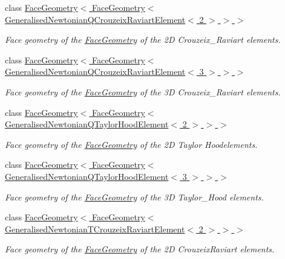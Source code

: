 \begin{DoxyCompactItemize}
\item 
class \hyperlink{classoomph_1_1FaceGeometry_3_01FaceGeometry_3_01GeneralisedNewtonianQCrouzeixRaviartElement_3_012_01_4_01_4_01_4}{Face\+Geometry$<$ Face\+Geometry$<$ Generalised\+Newtonian\+Q\+Crouzeix\+Raviart\+Element$<$ 2 $>$ $>$ $>$}
\begin{DoxyCompactList}\small\item\em Face geometry of the \hyperlink{classoomph_1_1FaceGeometry}{Face\+Geometry} of the 2D Crouzeix\+\_\+\+Raviart elements. \end{DoxyCompactList}\item 
class \hyperlink{classoomph_1_1FaceGeometry_3_01FaceGeometry_3_01GeneralisedNewtonianQCrouzeixRaviartElement_3_013_01_4_01_4_01_4}{Face\+Geometry$<$ Face\+Geometry$<$ Generalised\+Newtonian\+Q\+Crouzeix\+Raviart\+Element$<$ 3 $>$ $>$ $>$}
\begin{DoxyCompactList}\small\item\em Face geometry of the \hyperlink{classoomph_1_1FaceGeometry}{Face\+Geometry} of the 3D Crouzeix\+\_\+\+Raviart elements. \end{DoxyCompactList}\item 
class \hyperlink{classoomph_1_1FaceGeometry_3_01FaceGeometry_3_01GeneralisedNewtonianQTaylorHoodElement_3_012_01_4_01_4_01_4}{Face\+Geometry$<$ Face\+Geometry$<$ Generalised\+Newtonian\+Q\+Taylor\+Hood\+Element$<$ 2 $>$ $>$ $>$}
\begin{DoxyCompactList}\small\item\em Face geometry of the \hyperlink{classoomph_1_1FaceGeometry}{Face\+Geometry} of the 2D Taylor Hoodelements. \end{DoxyCompactList}\item 
class \hyperlink{classoomph_1_1FaceGeometry_3_01FaceGeometry_3_01GeneralisedNewtonianQTaylorHoodElement_3_013_01_4_01_4_01_4}{Face\+Geometry$<$ Face\+Geometry$<$ Generalised\+Newtonian\+Q\+Taylor\+Hood\+Element$<$ 3 $>$ $>$ $>$}
\begin{DoxyCompactList}\small\item\em Face geometry of the \hyperlink{classoomph_1_1FaceGeometry}{Face\+Geometry} of the 3D Taylor\+\_\+\+Hood elements. \end{DoxyCompactList}\item 
class \hyperlink{classoomph_1_1FaceGeometry_3_01FaceGeometry_3_01GeneralisedNewtonianTCrouzeixRaviartElement_3_012_01_4_01_4_01_4}{Face\+Geometry$<$ Face\+Geometry$<$ Generalised\+Newtonian\+T\+Crouzeix\+Raviart\+Element$<$ 2 $>$ $>$ $>$}
\begin{DoxyCompactList}\small\item\em Face geometry of the \hyperlink{classoomph_1_1FaceGeometry}{Face\+Geometry} of the 2D Crouzeix\+Raviart elements. \end{DoxyCompactList}\item 

\end{DoxyCompactItemize}
